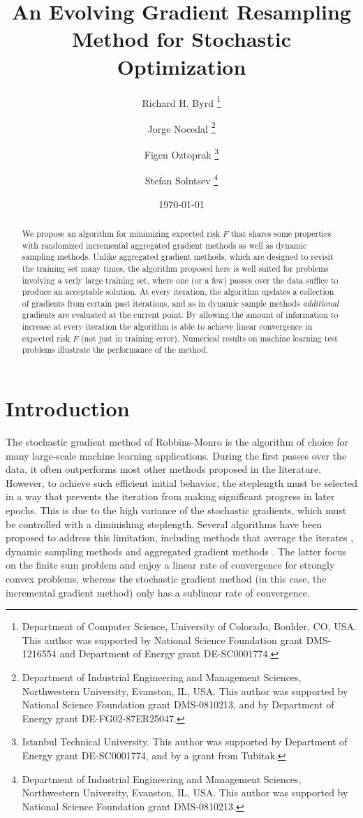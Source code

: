 \documentclass[11pt]{article}
\title{An Evolving Gradient Resampling Method for Stochastic Optimization}
\author{Richard H. Byrd 
\thanks{Department of Computer Science, University of Colorado, Boulder, CO, USA. This author was supported by National Science Foundation grant DMS-1216554 and Department of Energy grant DE-SC0001774.} 
\and Jorge Nocedal 
\thanks{Department of Industrial Engineering and Management Sciences, Northwestern University, Evanston, IL, USA. This author was supported by National Science Foundation grant DMS-0810213, and by Department of Energy grant DE-FG02-87ER25047.} 
\and Figen Oztoprak 
\thanks{Istanbul Technical University. This author was supported by Department of Energy grant DE-SC0001774, and by a grant from Tubitak.} 
\and Stefan Solntsev \thanks{Department of Industrial Engineering and Management Sciences, Northwestern University, Evanston, IL, USA. This author was supported by National Science Foundation grant DMS-0810213.} 
}
\date{\today}
\begin{document}
\maketitle 
\begin{abstract}
We propose an algorithm for minimizing expected risk $F$ that shares some properties with randomized  incremental aggregated gradient methods as well as  dynamic sampling methods. Unlike aggregated gradient methods, which are designed to revisit the training set many times, the algorithm proposed here is well suited for problems involving a verly large training set,  where one (or a few) passes over the data suffice to produce an acceptable solution.  At every iteration, the algorithm updates  a collection of gradients  from certain past iterations, and as in dynamic sample methods \emph{additional} gradients are evaluated at the current point. By allowing the amount of information to increase at every iteration the algorithm is able to achieve  linear convergence in expected risk $F$ (not just in training error). Numerical results on machine learning test problems illustrate the performance of the method. 
\end{abstract}
\newpage 

\section{Introduction}

The stochastic gradient method of Robbins-Monro \cite{RobMon51} is the algorithm of choice for many large-scale machine learning applications. During the first passes over the data, it often outperforms most other methods proposed in the literature. However, to achieve such efficient initial behavior, the steplength  must be selected in a way that prevents the iteration from making significant progress in later epochs. This is due to the high variance of the stochastic gradients, which must be controlled with a diminishing steplength. Several algorithms have been proposed to address this limitation, including methods that average the iterates \cite{PolJud92,ruppert1988efficient}, dynamic sampling methods \cite{dss,FS2011,2014pasglyetal} and aggregated gradient methods  \cite{roux2012stochastic,johnson2013accelerating,shalev2013stochastic,mairal2015incremental,defazio2014finito,frostig2014competing,NIPS2014_5258}. 
The latter focus on the finite sum problem and enjoy a linear rate of convergence for strongly convex problems, whereas the stochastic gradient method (in this case, the incremental gradient method) only has a sublinear rate of convergence. 
\end{document}

